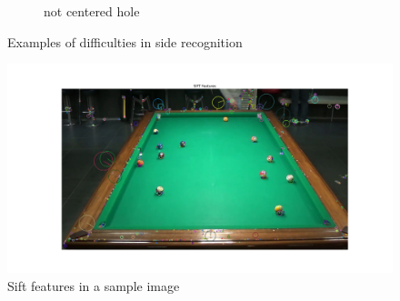 \begin{figure}
\begin{subfigure}[b]{\textwidth}
    \caption{not centered hole}
    \end{subfigure}
    \caption{Examples of difficulties in side recognition}
    \label{fig:difficultside}
\end{figure}
\begin{figure}
    \centering
    \includegraphics[width=\textwidth]{./imgs/sift.png}
    \caption{Sift features in a sample image}
    \label{fig:sift}
\end{figure}

